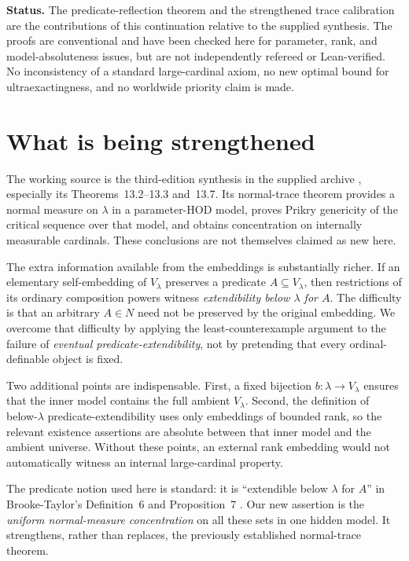 \documentclass[11pt,letterpaper]{article}
\theoremstyle{definition}
\numberwithin{equation}{section}
\begin{document}
\textbf{Status.} The predicate-reflection theorem and the strengthened trace calibration are the contributions of this continuation relative to the supplied synthesis. The proofs are conventional and have been checked here for parameter, rank, and model-absoluteness issues, but are not independently refereed or Lean-verified. No inconsistency of a standard large-cardinal axiom, no new optimal bound for ultraexactingness, and no worldwide priority claim is made.

\newpage
\tableofcontents

\section{What is being strengthened}\label{sec:intro}

The working source is the third-edition synthesis in the supplied archive \cite{source}, especially its Theorems~13.2--13.3 and~13.7. Its normal-trace theorem provides a normal measure on $\lambda$ in a parameter-HOD model, proves Prikry genericity of the critical sequence over that model, and obtains concentration on internally measurable cardinals. These conclusions are not themselves claimed as new here.

The extra information available from the embeddings is substantially richer. If an elementary self-embedding of $V_\lambda$ preserves a predicate $A\subseteq V_\lambda$, then restrictions of its ordinary composition powers witness \emph{extendibility below $\lambda$ for $A$}. The difficulty is that an arbitrary $A\in N$ need not be preserved by the original embedding. We overcome that difficulty by applying the least-counterexample argument to the failure of \emph{eventual predicate-extendibility}, not by pretending that every ordinal-definable object is fixed.

Two additional points are indispensable. First, a fixed bijection $b:\lambda\to V_\lambda$ ensures that the inner model contains the full ambient $V_\lambda$. Second, the definition of below-$\lambda$ predicate-extendibility uses only embeddings of bounded rank, so the relevant existence assertions are absolute between that inner model and the ambient universe. Without these points, an external rank embedding would not automatically witness an internal large-cardinal property.

The predicate notion used here is standard: it is ``extendible below $\lambda$ for $A$'' in Brooke-Taylor's Definition~6 and Proposition~7 \cite{bt}. Our new assertion is the \emph{uniform normal-measure concentration} on all these sets in one hidden model. It strengthens, rather than replaces, the previously established normal-trace theorem.
\end{document}
